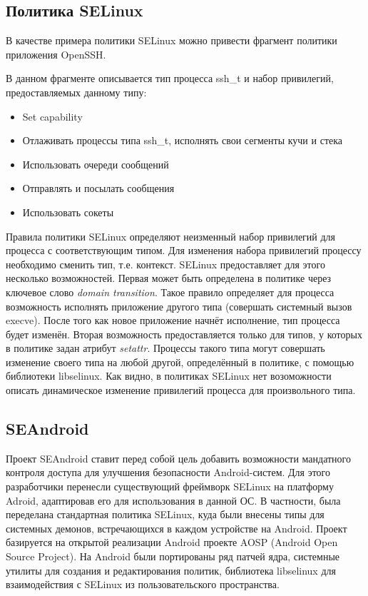 \subsection{Политика SELinux} 

В качестве примера политики SELinux можно привести
фрагмент политики приложения OpenSSH.


В данном фрагменте описывается тип процесса ssh\_t и
набор привилегий, предоставляемых данному типу:
\begin{itemize}
\item Set capability
\item Отлаживать процессы типа ssh\_t, исполнять свои сегменты
        кучи и стека
\item Использовать очереди сообщений
\item Отправлять и посылать сообщения
\item Использовать сокеты
\end{itemize}

Правила политики SELinux определяют неизменный набор привилегий для
процесса с соответствующим типом. Для изменения набора привилегий
процессу необходимо сменить тип, т.е. контекст. SELinux предоставляет
для этого несколько возможностей. Первая может быть определена в
политике через ключевое слово \emph{domain transition}. Такое правило
определяет для процесса возможность исполнять приложение другого типа
(совершать системный вызов execve). После того как новое приложение
начнёт исполнение, тип процесса будет изменён. Вторая возможность
предоставляется только для типов, у которых в политике задан атрибут
\emph{setattr}. Процессы такого типа могут совершать изменение своего типа на
любой другой, определённый в политике, с помощью библиотеки libselinux.
Как видно, в политиках SELinux нет возоможности описать динамическое
изменение привилегий процесса для произвольного типа.

\subsection{SEAndroid}

Проект SEAndroid ставит перед собой цель добавить возможности мандатного
контроля доступа для улучшения безопасности Android-систем. Для этого
разработчики перенесли существующий фреймворк SELinux на платформу
Adroid, адаптировав его для использования в данной ОС. В частности, была
переделана стандартная политика SELinux, куда были внесены типы для
системных демонов, встречающихся в каждом устройстве на Android. Проект
базируется на открытой реализации Android проекте AOSP (Android Open
Source Project). На Android были портированы ряд патчей ядра, системные
утилиты для создания и редактирования политик, библиотека libselinux для
взаимодействия с SELinux из пользовательского пространства. 

